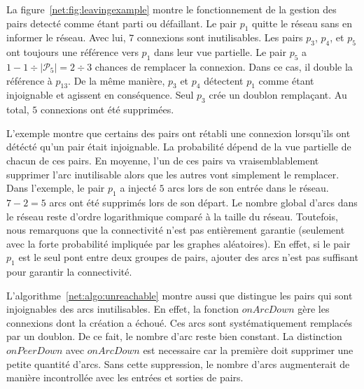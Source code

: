La figure~\ref{net:fig:leavingexample} montre le fonctionnement de la gestion des
pairs detecté comme étant parti ou défaillant. Le pair $p_1$ quitte le réseau
sans en informer le réseau. Avec lui, $7$ connexions sont inutilisables. Les
pairs $p_3$, $p_4$, et $p_5$ ont toujours une référence vers $p_1$ dans leur vue
partielle. Le pair $p_5$ a $1-{1\div{|\mathcal{P}_5|}}={2\div{3}}$ chances de
remplacer la connexion. Dans ce cas, il double la référence à $p_{13}$. De la
même manière, $p_3$ et $p_4$ détectent $p_1$ comme étant injoignable et agissent
en conséquence. Seul $p_3$ crée un doublon remplaçant. Au total, $5$ connexions
ont été supprimées.

L'exemple montre que certains des pairs ont rétabli une connexion lorsqu'ils ont
détécté qu'un pair était injoignable. La probabilité dépend de la vue partielle
de chacun de ces pairs. En moyenne, l'un de ces pairs va vraisemblablement
supprimer l'arc inutilisable alors que les autres vont simplement le
remplacer. Dans l'exemple, le pair $p_1$ a injecté $5$ arcs lors de son entrée
dans le réseau. $7-2 = 5$ arcs ont été supprimés lors de son départ. Le nombre
global d'arcs dans le réseau reste d'ordre logarithmique comparé à la taille du
réseau. Toutefois, nous remarquons que la connectivité n'est pas entièrement
garantie (seulement avec la forte probabilité impliquée par les graphes
aléatoires). En effet, si le pair $p_1$ est le seul pont entre deux groupes de
pairs, ajouter des arcs n'est pas suffisant pour garantir la connectivité.

L'algorithme~\ref{net:algo:unreachable} montre aussi que \SPRAY distingue les
pairs qui sont injoignables des arcs inutilisables. En effet, la fonction
$onArcDown$ gère les connexions dont la création a échoué. Ces arcs sont
systématiquement remplacés par un doublon. De ce fait, le nombre d'arc reste
bien constant. La distinction $onPeerDown$ avec $onArcDown$ est necessaire car
la première doit supprimer une petite quantité d'arcs. Sans cette suppression,
le nombre d'arcs augmenterait de manière incontrollée avec les entrées et
sorties de pairs.

